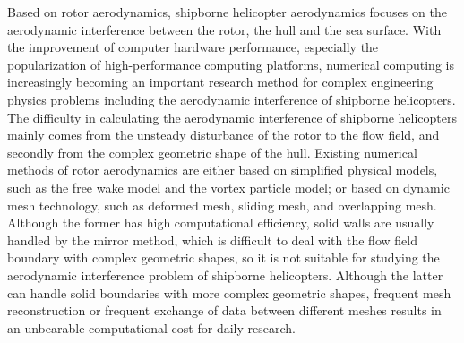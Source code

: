 \begin{eabstract}
Based on rotor aerodynamics, shipborne helicopter aerodynamics focuses on the aerodynamic interference between the rotor, the hull and the sea surface.
With the improvement of computer hardware performance, especially the popularization of high-performance computing platforms, numerical computing is increasingly becoming an important research method for complex engineering physics problems including the aerodynamic interference of shipborne helicopters.
The difficulty in calculating the aerodynamic interference of shipborne helicopters mainly comes from the unsteady disturbance of the rotor to the flow field, and secondly from the complex geometric shape of the hull.
Existing numerical methods of rotor aerodynamics are either based on simplified physical models, such as the free wake model and the vortex particle model; or based on dynamic mesh technology, such as deformed mesh, sliding mesh, and overlapping mesh.
Although the former has high computational efficiency, solid walls are usually handled by the mirror method, which is difficult to deal with the flow field boundary with complex geometric shapes, so it is not suitable for studying the aerodynamic interference problem of shipborne helicopters.
Although the latter can handle solid boundaries with more complex geometric shapes, frequent mesh reconstruction or frequent exchange of data between different meshes results in an unbearable computational cost for daily research.


\end{eabstract}
